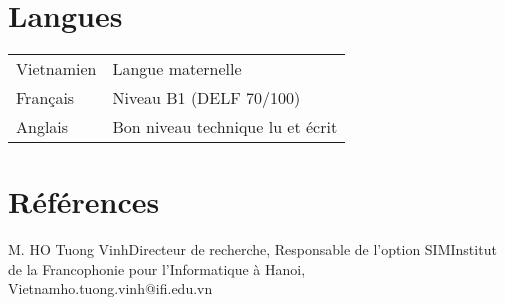 \documentclass[a4paper,11pt]{article}
\begin{document}
\section{Langues}
\begin{tabular}{p{2.5cm}l}
	Vietnamien & Langue maternelle\\
	Français & Niveau B1 (DELF 70/100)\\
	Anglais & Bon niveau technique lu et écrit  %
\end{tabular}
\section{Références}
\begin{itemReference}{M. HO Tuong Vinh}{Directeur de recherche, Responsable de l'option 
SIM}{Institut de la Francophonie pour l'Informatique à Hanoi, 
Vietnam}{ho.tuong.vinh@ifi.edu.vn}
\end{itemReference}
\end{document}
